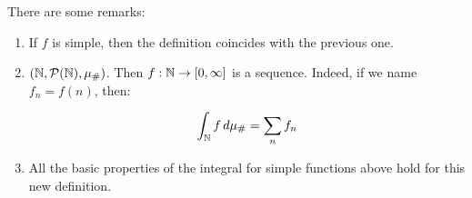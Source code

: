 \begin{fremark}
    There are some remarks:
    \vspace{1em}

    \begin{enumerate}
        \item If $f$ is simple, then the definition coincides with the previous one.
        \vspace{1em}

        \item $(\mathbb{N}, \mathcal{P}(\mathbb{N}), \mu_{\#})$. Then $f: \mathbb{N} \to [0, \infty]$ is a sequence. Indeed, if we
        name $f_n = f(n)$, then:

        $$\int_{\mathbb{N}} f \, d\mu_{\#} = \sum_{n} f_n$$
        \vspace{1em}

        \item All the basic properties of the integral for simple functions above hold for this
        new definition.
    \end{enumerate}

\end{fremark}



